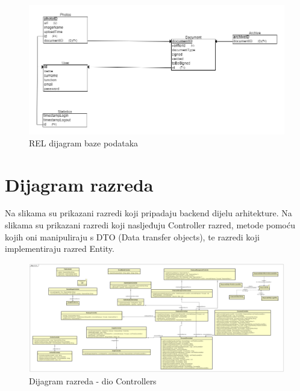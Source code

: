					\begin{figure}[H]
					\includegraphics[scale=0.5]{slike/kompletici_v3_REL.PNG} %
					\centering
					\caption{REL dijagram baze podataka}
					\label{fig:promjene}
				\end{figure}
				
				
			
			\eject
			
			
		\section{Dijagram razreda}

		Na slikama su prikazani razredi koji pripadaju backend dijelu arhitekture. Na slikama su prikazani razredi koji nasljeđuju Controller razred, metode pomoću kojih oni manipuliraju s DTO (Data transfer objects), te razredi koji implementiraju razred Entity.
		
			\begin{figure}[H]
				\includegraphics[scale=0.5]{slike/dijagram_razreda_controller.png} %
				\centering
				\caption{Dijagram razreda - dio Controllers}
				\label{fig:promjene}
			\end{figure}
			
